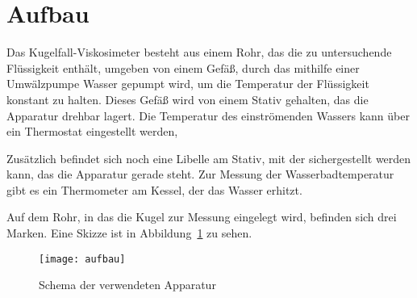 
\section{Aufbau}

Das Kugelfall-Viskosimeter besteht aus einem Rohr, das die zu
untersuchende Flüssigkeit enthält, umgeben von einem Gefäß, durch das
mithilfe einer Umwälzpumpe Wasser gepumpt wird, um die Temperatur der
Flüssigkeit konstant zu halten. Dieses Gefäß wird von einem Stativ
gehalten, das die Apparatur drehbar lagert. Die Temperatur des
einströmenden Wassers kann über ein Thermostat eingestellt werden,

Zusätzlich befindet sich noch eine Libelle am Stativ, mit der
sichergestellt werden kann, das die Apparatur gerade steht.  Zur Messung
der Wasserbadtemperatur gibt es ein Thermometer am Kessel, der das
Wasser erhitzt.

Auf dem Rohr, in das die Kugel zur Messung eingelegt wird, befinden sich
drei Marken. Eine Skizze ist in Abbildung~\ref{fig:aufbau} zu sehen.

\begin{figure}
  \centering
  \texttt{[image: aufbau]}
  \caption{Schema der verwendeten Apparatur}
  \label{fig:aufbau}
\end{figure}
